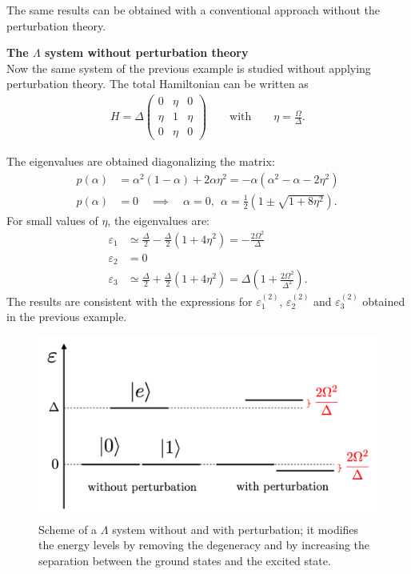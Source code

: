 The same results can be obtained with a conventional approach without the perturbation theory. 

\begin{tcolorbox}
\textbf{The $\Lambda$ system without perturbation theory} \\
Now the same system of the previous example is studied without applying perturbation theory. The total Hamiltonian can be written as 
\begin{align*}
    H = \Delta \begin{pmatrix} 0 & \eta & 0 \\ \eta & 1 & \eta \\ 0 & \eta & 0 \end{pmatrix} \qquad \text{with} \qquad \eta = \frac{\Omega}{\Delta}.
\end{align*}

The eigenvalues are obtained diagonalizing the matrix:
\begin{align*}
    p(\alpha) &= \alpha^2 (1-\alpha) + 2 \alpha \eta^2 = -\alpha (\alpha^2 - \alpha - 2 \eta^2) \\
    p(\alpha) &= 0 \quad \implies \quad \alpha = 0, ~~\alpha = \frac{1}{2} \left( 1 \pm \sqrt{1+ 8 \eta^2}\right).
\end{align*}
For small values of $\eta$, the eigenvalues are:
\begin{align*}
    \varepsilon_1 &\simeq \frac{\Delta}{2} -\frac{\Delta}{2}(1 + 4 \eta^2) = - \frac{2 \Omega^2}{\Delta} \\
    \varepsilon_2 &= 0 \\
    \varepsilon_3 &\simeq \frac{\Delta}{2} + \frac{\Delta}{2}(1 + 4 \eta^2) = \Delta\left( 1 + \frac{2 \Omega^2}{\Delta^2}\right).
\end{align*}
The results are consistent with the expressions for $\varepsilon_1^{(2)}$, $\varepsilon_2^{(2)}$ and $\varepsilon_3^{(2)}$ obtained in the previous example. 
\end{tcolorbox}

\begin{figure}[H]
\centering
\includegraphics[width=0.66\linewidth]{images/Lambda_system.png}
    \caption{Scheme of a $\Lambda$ system without and with perturbation; it modifies the energy levels by removing the degeneracy and by increasing the separation between the ground states and the excited state.}
    \label{fig:lambda_sys}
\end{figure}

